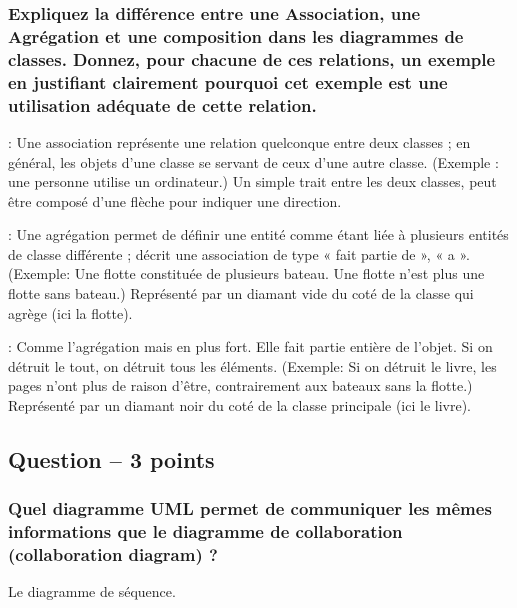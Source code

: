 \subsubsection{Expliquez la différence entre une Association, une Agrégation et une composition dans les diagrammes de classes. Donnez, pour chacune de ces relations, un exemple en justifiant clairement pourquoi cet exemple est une utilisation adéquate de cette relation.}
\begin{description}
\color[rgb]{0,0.48,0.58}
	\item [Association]: Une association représente une relation quelconque entre deux classes ; en général, les objets d'une classe se servant de ceux d'une autre classe. (Exemple : une personne utilise un ordinateur.) Un simple trait entre les deux classes, peut être composé d'une flèche pour indiquer une direction.

	\item [Agrégation]: Une agrégation permet de définir une entité comme étant liée à plusieurs entités de classe différente ; décrit une association de type « fait partie de », « a ». (Exemple: Une flotte constituée de plusieurs bateau. Une flotte n'est plus une flotte sans bateau.) Représenté par un diamant vide du coté de la classe qui agrège (ici la flotte).

	\item [Composition]: Comme l'agrégation mais en plus fort. Elle fait partie entière de l'objet. Si on détruit le tout, on détruit tous les éléments. (Exemple: Si on détruit le livre, les pages n'ont plus de raison d'être, contrairement aux bateaux sans la flotte.) Représenté par un diamant noir du coté de la classe principale (ici le livre).

\end{description}




\subsection{Question – 3 points}



\subsubsection{Quel diagramme UML permet de communiquer les mêmes informations que le diagramme de collaboration (collaboration diagram) ?}
\textcolor[rgb]{0,0.48,0.58}{Le diagramme de séquence.}



